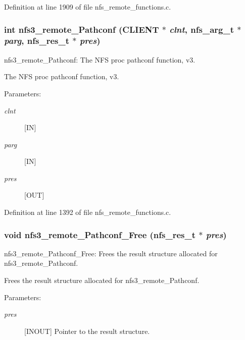 Definition at line 1909 of file nfs\_\-remote\_\-functions.c.
\subsubsection[{nfs3\_\-remote\_\-Pathconf}]{\setlength{\rightskip}{0pt plus 5cm}int nfs3\_\-remote\_\-Pathconf (CLIENT $\ast$ {\em clnt}, \/  nfs\_\-arg\_\-t $\ast$ {\em parg}, \/  nfs\_\-res\_\-t $\ast$ {\em pres})}\label{group__NFSprocs_g7324608c74b467cc68a15cd3dc83a136}


nfs3\_\-remote\_\-Pathconf: The NFS proc pathconf function, v3.

The NFS proc pathconf function, v3.

\begin{Desc}
\item[Parameters:]
\begin{description}
\item[{\em clnt}][IN] \item[{\em parg}][IN] \item[{\em pres}][OUT] \end{description}
\end{Desc}


Definition at line 1392 of file nfs\_\-remote\_\-functions.c.
\subsubsection[{nfs3\_\-remote\_\-Pathconf\_\-Free}]{\setlength{\rightskip}{0pt plus 5cm}void nfs3\_\-remote\_\-Pathconf\_\-Free (nfs\_\-res\_\-t $\ast$ {\em pres})}\label{group__NFSprocs_g75f4f29ffcdaccec26fb2d1f95b93460}


nfs3\_\-remote\_\-Pathconf\_\-Free: Frees the result structure allocated for nfs3\_\-remote\_\-Pathconf.

Frees the result structure allocated for nfs3\_\-remote\_\-Pathconf.

\begin{Desc}
\item[Parameters:]
\begin{description}
\item[{\em pres}][INOUT] Pointer to the result structure. \end{description}
\end{Desc}



